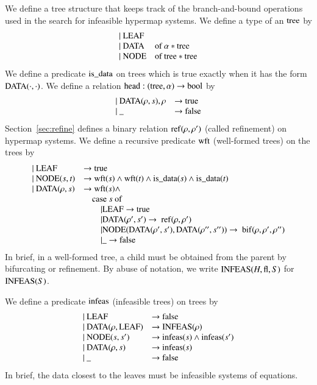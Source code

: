 We define a tree structure that keeps track of the
branch-and-bound operations used in the search for infeasible
hypermap systems.  We define a type of an ${\operatorname{tree}}$ by
    $$
    \begin{array}{lll}
    |\ {\operatorname{LEAF}}&\\
    |\ {\operatorname{DATA}} &\text{of } \alpha * {\operatorname{tree}}\\
    |\ {\operatorname{NODE}} &\text{of } {\operatorname{tree}} * {\operatorname{tree}}\\
    \end{array}
    $$
%
We define a predicate ${\operatorname{is\_data}}$ on trees which is true
exactly when it has the form ${\operatorname{DATA}}(\cdot,\cdot)$. We define a
relation ${\operatorname{head}}:({\operatorname{tree}},\alpha)\to \operatorname{bool}$ by
    $$
    \begin{array}{lll}
    |\ {\operatorname{DATA}}(\rho,s),\rho &\to {\operatorname{true}}\\
    |\  {\operatorname{\_}} &\to {\operatorname{false}}
    \end{array}
    $$
Section~\ref{sec:refine} defines a binary relation
${\operatorname{ref}}(\rho,\rho')$ (called refinement) on hypermap systems. We
define a recursive predicate ${\operatorname{wft}}$ (well-formed trees) on the
trees by
    $$
    \begin{array}{lll}
    |\ {\operatorname{LEAF}} &\to{\operatorname{true}}\\
    |\ {\operatorname{NODE}}(s,t) &\to {\operatorname{wft}}(s) \wedge {\operatorname{wft}}(t)
    \wedge {\operatorname{is\_data}}(s) \wedge {\operatorname{is\_data}}(t)\\
    |\ {\operatorname{DATA}}(\rho,s) &\to {\operatorname{wft}}(s) \wedge\\
        &\quad \text{case}\ s\ \text{of}\\
        &\qquad|{\operatorname{LEAF}}\to{\operatorname{true}}\\
        &\qquad|{\operatorname{DATA}}(\rho',s')\to \ {\operatorname{ref}}(\rho,\rho')\\
        &\qquad|{\operatorname{NODE}}({\operatorname{DATA}}(\rho',s'),{\operatorname{DATA}}(\rho'',s''))\to
        \ {\operatorname{bif}}(\rho,\rho',\rho'')\\
        &\qquad|{\operatorname{\_}} \to {\operatorname{false}}\\
    \end{array}
    $$
In brief, in a well-formed tree, a child must be obtained from the
parent by bifurcating or refinement.
%
By abuse of notation, we write ${\operatorname{INFEAS}}(H,{\operatorname{fl}},S)$ for
${\operatorname{INFEAS}}(S)$.

We define a predicate ${\operatorname{infeas}}$ (infeasible trees) on trees by
    $$
    \begin{array}{lll}
    |\ {\operatorname{LEAF}} &\to {\operatorname{false}}\\
    |\ {\operatorname{DATA}}(\rho,{\operatorname{LEAF}}) &\to {\operatorname{INFEAS}}(\rho)\\
    |\ {\operatorname{NODE}}(s,s') &\to {\operatorname{infeas}}(s) \wedge {\operatorname{infeas}}(s')\\
    |\ {\operatorname{DATA}}(\rho,s) &\to {\operatorname{infeas}}(s)\\
    |\ {\operatorname{\_}} &\to {\operatorname{false}}\\
    \end{array}
    $$
In brief, the data closest to the leaves must be infeasible
systems of equations.

